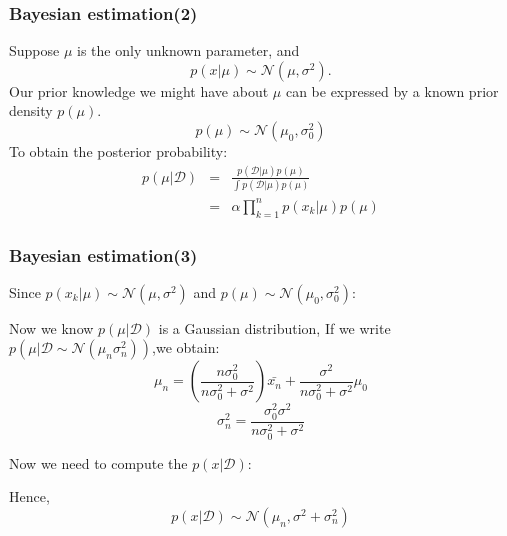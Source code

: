 \documentclass[slidestop,compress,mathserif]{beamer}
\begin{document}
    \begin{frame}
    	\frametitle{Bayesian estimation(2)}
    	Suppose $\mu$ is the only unknown parameter, and
    	$$p(x|\mu)\sim \mathcal{N}(\mu,\sigma^2).$$
    	Our prior knowledge we might have about $\mu$ can be expressed by a known prior density $p(\mu)$.
    	$$p(\mu)\sim \mathcal{N}(\mu_0,\sigma_0^2)$$
    	To obtain the posterior probability:
    	\begin{eqnarray*}
    		p(\mu|\mathcal{D}) &=& \frac{p(\mathcal{D}|\mu)p(\mu)}{\int p(\mathcal{D|\mu})p(\mu)}\\
    		&=&\alpha\prod_{k=1}^np(x_k|\mu)p(\mu)
    	\end{eqnarray*}
    \end{frame}
    \begin{frame}[shrink]
    	\frametitle{Bayesian estimation(3)}
    	Since $p(x_k|\mu)\sim\mathcal{N}(\mu,\sigma^2)$ and $p(\mu)\sim\mathcal{N}(\mu_0,\sigma_0^2)$:
    	\begin{figure}
    	\end{figure}
    	Now we know $p(\mu|\mathcal{D})$ is a Gaussian distribution, If we write $p(\mu|\mathcal{D}\sim\mathcal{N}(\mu_n\sigma_n^2))$,we obtain:
    	$$\mu_n=\left(\frac{n\sigma_0^2}{n\sigma_0^2+\sigma^2}\right)\bar{x_n}+\frac{\sigma^2}{n\sigma_0^2+\sigma^2}\mu_0$$
    	$$\sigma_n^2=\frac{\sigma_0^2\sigma^2}{n\sigma_0^2+\sigma^2}$$
    	
    \end{frame}
    \begin{frame}
    	Now we need to compute the $p(x|\mathcal{D})$:
    	\begin{figure}
    	\end{figure}
    	Hence,
    	$$p(x|\mathcal{D})\sim\mathcal{N}(\mu_n,\sigma^2+\sigma_n^2)$$
    \end{frame}
\end{document}
